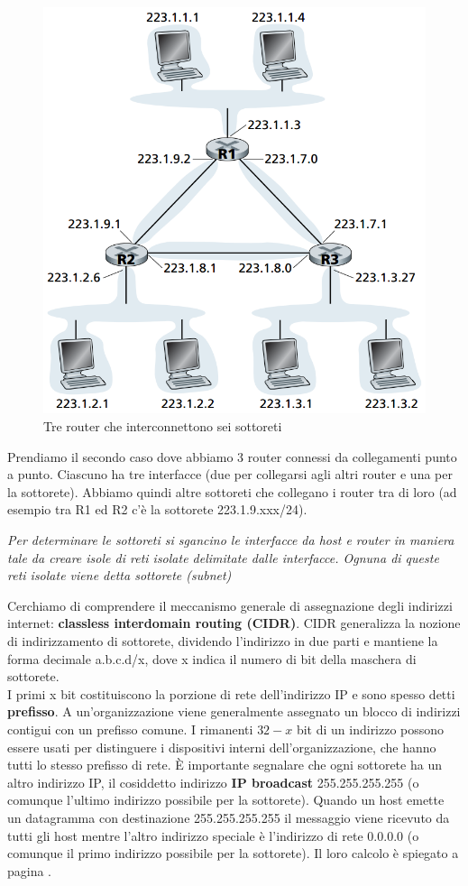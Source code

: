 \documentclass[11pt,a4paper]{article}
\begin{document}
\begin{figure}
	\includegraphics[scale=0.6]{img/055.png}
	\caption{Tre router che interconnettono sei sottoreti}
\end{figure}
Prendiamo il secondo caso dove abbiamo 3 router connessi da collegamenti punto a punto. Ciascuno ha tre interfacce (due per collegarsi agli altri router e una per la sottorete). Abbiamo quindi altre sottoreti che collegano i router tra di loro (ad esempio tra R1 ed R2 c'è la sottorete 223.1.9.xxx/24).
\begin{center}
	\textit{Per determinare le sottoreti si sgancino le interfacce da host e router in maniera tale da creare isole di reti isolate delimitate dalle interfacce. Ognuna di queste reti isolate viene detta sottorete (subnet)}
\end{center}
Cerchiamo di comprendere il meccanismo generale di assegnazione degli indirizzi internet: \textbf{classless interdomain routing (CIDR)}. CIDR generalizza la nozione di indirizzamento di sottorete, dividendo l'indirizzo in due parti e mantiene la forma decimale a.b.c.d/x, dove x indica il numero di bit della maschera di sottorete. \\
I primi x bit costituiscono la porzione di rete dell'indirizzo IP e sono spesso detti \textbf{prefisso}. A un'organizzazione viene generalmente assegnato un blocco di indirizzi contigui con un prefisso comune. I rimanenti $32-x$ bit di un indirizzo possono essere usati per distinguere i dispositivi interni dell'organizzazione, che hanno tutti lo stesso prefisso di rete. È importante segnalare che ogni sottorete ha un altro indirizzo IP, il cosiddetto indirizzo \textbf{IP broadcast} 255.255.255.255 (o comunque l'ultimo indirizzo possibile per la sottorete). Quando un host emette un datagramma con destinazione 255.255.255.255 il messaggio viene ricevuto da tutti gli host mentre l'altro indirizzo speciale è l'indirizzo di rete 0.0.0.0 (o comunque il primo indirizzo possibile per la sottorete). Il loro calcolo è spiegato a pagina \pageref{pag: 001}.
\end{document}
